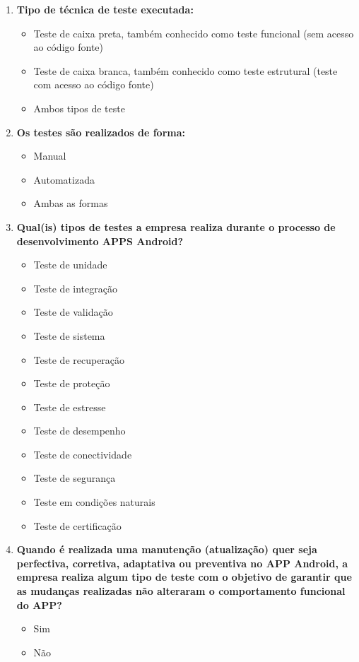 \begin{enumerate}[label=\bf A\arabic*,leftmargin=1.8cm]
     \begin{enumerate}[label= \arabic*]
     
     \item \textbf{Tipo de técnica de teste executada:}
     \begin{itemize}
         \item Teste de caixa preta, também conhecido como teste funcional (sem acesso ao código fonte)
         \item Teste de caixa branca, também conhecido como teste estrutural (teste com acesso ao código fonte)
         \item Ambos tipos de teste
     \end{itemize}
     
    \item \textbf{Os testes são realizados de forma:}
     \begin{itemize}
        \item Manual
        \item Automatizada
        \item Ambas as formas
     \end{itemize}
    
    \item \textbf{Qual(is) tipos de testes a empresa realiza durante o processo de desenvolvimento \ac{APPS} Android?}
    \begin{itemize}
        \item Teste de unidade
        \item Teste de integração
        \item Teste de validação
        \item Teste de sistema
        \item Teste de recuperação
        \item Teste de proteção
        \item Teste de estresse
        \item Teste de desempenho
        \item Teste de conectividade
        \item Teste de segurança
        \item Teste em condições naturais
        \item Teste de certificação
    \end{itemize}
     
     \item \textbf{Quando é realizada uma manutenção (atualização) quer seja perfectiva, corretiva, adaptativa ou preventiva no APP Android, a empresa realiza algum tipo de teste com o objetivo de garantir que as mudanças realizadas não alteraram o comportamento funcional do APP?}
     \begin{itemize}
         \item Sim
         \item Não
     \end{itemize}
     

\end{enumerate}
\end{enumerate}

